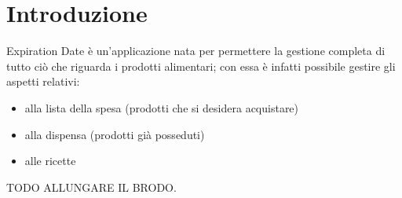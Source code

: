 \chapter{Introduzione}

Expiration Date è un'applicazione nata per permettere la gestione completa di tutto ciò che riguarda i prodotti alimentari; con essa è infatti possibile gestire gli aspetti relativi:
\begin{itemize}

  \item alla lista della spesa (prodotti che si desidera acquistare)
  \item alla dispensa (prodotti già posseduti)
  \item alle ricette
  
\end{itemize}

TODO ALLUNGARE IL BRODO.